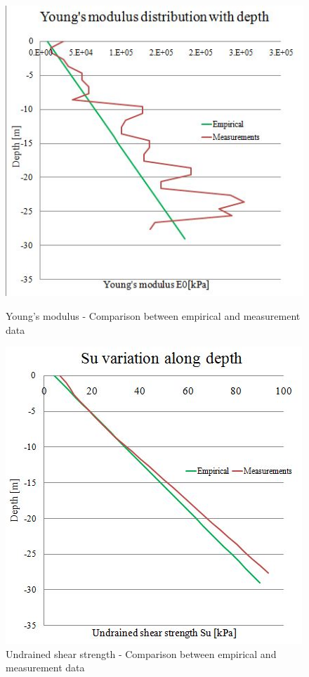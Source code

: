\documentclass[12pt,a4paper]{report}
\begin{document}
\begin{figure}[!h]
\centering
\begin{minipage}[b]{0.45\textwidth}
\includegraphics[width=\textwidth]{"youngss1"}
\caption{Young's modulus - Comparison between empirical and measurement data}
\label{youngss}
\end{minipage}
\hfill
\begin{minipage}[b]{0.45\textwidth}
	\includegraphics[width=\textwidth]{"su2"}
	\caption{Undrained shear strength - Comparison between empirical and measurement data}
	\label{Su2}
\end{minipage}
\end{figure}
\end{document}
